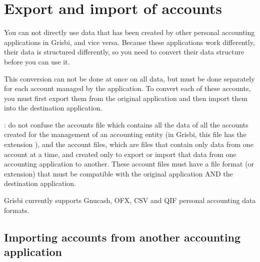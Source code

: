 

\chapter{Export and import of accounts\label{move}}

You can not directly use data that has been created by other personal accounting applications in Grisbi, and vice versa. Because these applications work differently, their data is structured differently, so you need to convert their data structure before you can use it. 

This conversion can not be done at once on all data, but must be done separately for each account managed by the application. To convert each of these accounts, you must first \og export \fg{}them from the original application and then \og import \fg{} them into the destination application.


 :  do not confuse the \og accounts file \fg{}which contains all the data of all the accounts created for the management of an accounting entity (in Grisbi, this file has the \gls{extension} ), and the \og account files\fg{}, which are files that contain only data from one account at a time, and created only to export or import that data from one accounting application to another. These \og account files  \fg{}  must have a  \gls{file format} (or extension) that must be compatible with the original application AND the destination application.

Grisbi currently supports \gls{Gnucash}, \gls{OFX}, \gls{CSV} and \gls{QIF} personal accounting data formats.

\section{Importing accounts from another accounting application\label{move-import}}

